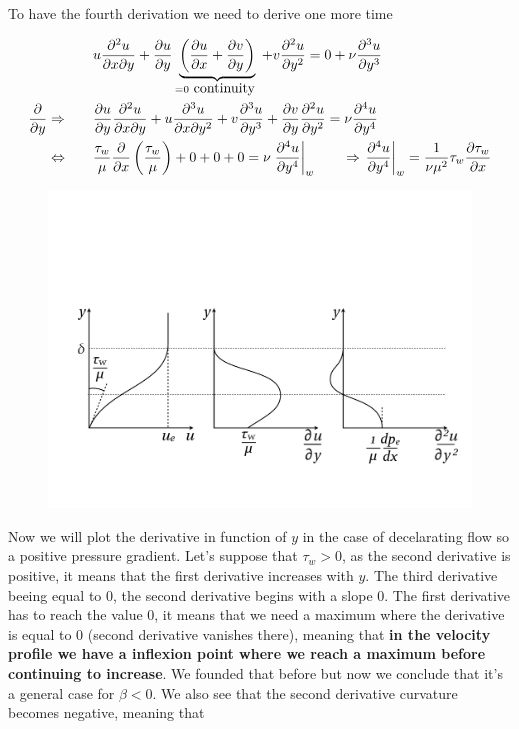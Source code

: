 	To have the fourth derivation we need to derive one more time 
	
	\begin{equation}
	\begin{aligned}
	&u \frac{\D ^2 u}{\D x \D y} + \frac{\D u}{\D y}\underbrace{\left(\frac{\D u}{\D x} + \frac{\D v}{\D y}\right)}_{=0 \mbox{ continuity }} + v \frac{\D ^2 u}{\D y^2} =0+ \nu \frac{\D ^3 u}{\D y^3} \\
		\frac{\D}{\D y}\Rightarrow  \qquad 
		&\frac{\D u}{\D y}\frac{\D ^2 u}{\D x \D y} +  u\frac{\D ^3 u}{\D x \D y^2} + v \frac{\D ^3 u}{\D y^3} + \frac{\D v}{\D y} \frac{\D ^2 u}{\D y^2} = \nu \frac{\D ^4 u}{\D y^4} \\
		\Leftrightarrow \qquad &\frac{\tau _w}{\mu}\frac{\D}{\D x}\left(\frac{\tau _w}{\mu}\right) + 0 + 0 +  0 = \nu \left.\frac{\D ^4 u}{\D y^4}\right| _w \qquad \Rightarrow \left.\frac{\D ^4 u}{\D y^4}\right| _w = \frac{1}{\nu \mu ^2}\tau _w \frac{\D\tau _w}{\D x}
	\end{aligned}
	\end{equation}
	
	\begin{figure}
	\vspace{-5mm}
	\includegraphics[scale=0.2]{ch5/15}
	\label{fig:5.15}
	\end{figure}
	Now we will plot the derivative in function of $y$ in the case of decelarating flow so a positive pressure gradient. Let's suppose that $\tau _w >0$, as the second derivative is positive, it means that the first derivative increases with $y$. The third derivative beeing equal to 0, the second derivative begins with a slope 0. The first derivative has to reach the value 0, it means that we need a maximum where the derivative is equal to 0 (second derivative vanishes there), meaning that \textbf{in the velocity profile we have a inflexion point where we reach a maximum before continuing to increase}. We founded that before but now we conclude that it's a general case for $\beta <0$. We also see that the second derivative curvature becomes negative, meaning that 
	
